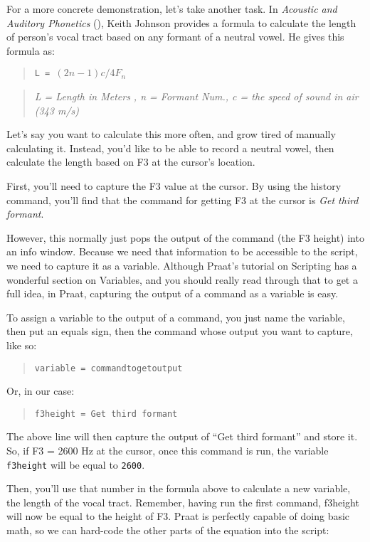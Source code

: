 For a more concrete demonstration, let's take another task. In
\emph{Acoustic and Auditory Phonetics} (\cite{Johnson:1997aa}), Keith
Johnson provides a formula to calculate the length of person's vocal
tract based on any formant of a neutral vowel. He gives this formula as:

\begin{quote}
\texttt{L = $(2n-1)c/4F_n$}
\end{quote}

\begin{quote}
\emph{L = Length in Meters , n = Formant Num., c = the speed of sound in
air (343 m/s)}
\end{quote}

Let's say you want to calculate this more often, and grow tired of
manually calculating it. Instead, you'd like to be able to record a
neutral vowel, then calculate the length based on F3 at the cursor's
location.

First, you'll need to capture the F3 value at the cursor. By using the
history command, you'll find that the command for getting F3 at the
cursor is \emph{Get third formant}.

However, this normally just pops the output of the command (the F3
height) into an info window. Because we need that information to be
accessible to the script, we need to capture it as a variable. Although
Praat's tutorial on Scripting has a wonderful section on Variables, and
you should really read through that to get a full idea, in Praat,
capturing the output of a command as a variable is easy.

To assign a variable to the output of a command, you just name the
variable, then put an equals sign, then the command whose output you
want to capture, like so:

\begin{quote}
\texttt{variable = commandtogetoutput}
\end{quote}

Or, in our case:

\begin{quote}
\texttt{f3height = Get third formant}
\end{quote}

The above line will then capture the output of ``Get third formant'' and
store it. So, if F3 = 2600 Hz at the cursor, once this command is run,
the variable \texttt{f3height} will be equal to \texttt{2600}.

Then, you'll use that number in the formula above to calculate a new
variable, the length of the vocal tract. Remember, having run the first
command, f3height will now be equal to the height of F3. Praat is
perfectly capable of doing basic math, so we can hard-code the other
parts of the equation into the script:

